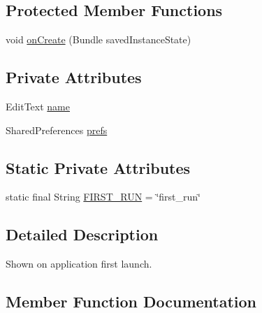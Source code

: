 \subsection*{Protected Member Functions}
\begin{DoxyCompactItemize}
\item 
void \hyperlink{classorg_1_1buildmlearn_1_1toolkit_1_1activity_1_1FirstRunActivity_a847a7bc25bdbd77b2a7bc90cd3ca38bb}{on\+Create} (Bundle saved\+Instance\+State)
\end{DoxyCompactItemize}
\subsection*{Private Attributes}
\begin{DoxyCompactItemize}
\item 
Edit\+Text \hyperlink{classorg_1_1buildmlearn_1_1toolkit_1_1activity_1_1FirstRunActivity_a955ca4cb27e9e7e230f2c2552e291192}{name}
\item 
Shared\+Preferences \hyperlink{classorg_1_1buildmlearn_1_1toolkit_1_1activity_1_1FirstRunActivity_aa1cc5d447dab2d50362d3b4160a28fea}{prefs}
\end{DoxyCompactItemize}
\subsection*{Static Private Attributes}
\begin{DoxyCompactItemize}
\item 
static final String \hyperlink{classorg_1_1buildmlearn_1_1toolkit_1_1activity_1_1FirstRunActivity_a9b8e3a45cdcff62600723fb7dc75f7ca}{F\+I\+R\+S\+T\+\_\+\+R\+UN} = \char`\"{}first\+\_\+run\char`\"{}
\end{DoxyCompactItemize}


\subsection{Detailed Description}
Shown on application first launch. 

\subsection{Member Function Documentation}
